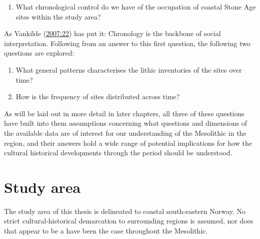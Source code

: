 \documentclass[
  12pt,
  a4paper,
  oneside]{book}
\providecommand{\tightlist}{%
  \setlength{\itemsep}{0pt}\setlength{\parskip}{0pt}}
\begin{document}
\begin{enumerate}
\def\labelenumi{\arabic{enumi})}
\tightlist
\item
  What chronological control do we have of the occupation of coastal Stone Age sites within the study area?
\end{enumerate}

As Vankilde (\protect\hyperlink{ref-vankilde2007}{2007:22}) has put it: \textquotesingle Chronology is the backbone of social interpretation\textquotesingle. Following from an answer to this first question, the following two questions are explored:

\begin{enumerate}
\def\labelenumi{\arabic{enumi})}
\setcounter{enumi}{1}
\tightlist
\item
  What general patterns characterises the lithic inventories of the sites over time?
\item
  How is the frequency of sites distributed across time?
\end{enumerate}

As will be laid out in more detail in later chapters, all three of these questions have built into them assumptions concerning what questions and dimensions of the available data are of interest for our understanding of the Mesolithic in the region, and their answers hold a wide range of potential implications for how the cultural historical developments through the period should be understood.

\hypertarget{study-area}{%
\section{Study area}\label{study-area}}

The study area of this thesis is delineated to coastal south-eastern Norway. No strict cultural-historical demarcation to surrounding regions is assumed, nor does that appear to be a have been the case throughout the Mesolithic.
\end{document}
